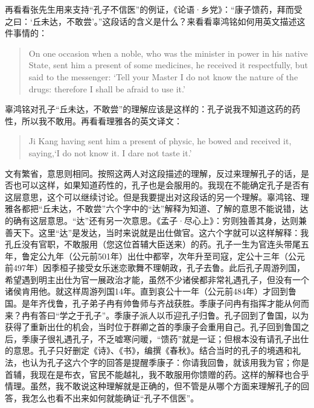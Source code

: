 再看看张先生用来支持“孔子不信医”的例证，《论语·乡党》：“康子馈药，拜而受之曰：‘丘未达，不敢尝’。”这段话的含义是什么？来看看辜鸿铭如何用英文描述这件事情的：
\begin{quote}
On one occasion when a noble, who was the minister in power in his native State, sent him a present of some medicines, he received it respectfully, but said to the messenger: `Tell your Master I do not know the nature of the drugs: therefore I shall be afraid to use it.' 
\end{quote}
辜鸿铭对孔子“丘未达，不敢尝”的理解应该是这样的：孔子说我不知道这药的药性，所以我不敢用。再看看理雅各的英文译文：
\begin{quote}
Ji Kang having sent him a present of physic, he bowed and received it, saying,`I do not know it. I dare not taste it.'
\end{quote}
文有繁省，意思则相同。按照这两人对这段描述的理解，反过来理解孔子的话，是否也可以这样，如果知道药性的，孔子也是会服用的。我现在不能确定孔子是否有这层意思，这个可以继续讨论。但是我要提出对这段话的另一个理解。辜鸿铭、理雅各都把“丘未达，不敢尝”六个字中的“达”解释为知道、了解的意思不能说错，达的确有这层意思。“达”还有另一次意思。《孟子·尽心上》：穷则独善其身，达则兼善天下。这里“达”是发达，当时来说就是出仕做官。这六个字就可以这样解释：我孔丘没有官职，不敢服用（您这位首辅大臣送来）的药。孔子一生为官连头带尾五年，鲁定公九年（公元前501年）出仕中都宰，次年升至司寇，定公十三年（公元前497年）因季桓子接受女乐迷恋歌舞不理朝政，孔子去鲁。此后孔子周游列国，希望遇到明主出仕为官一展政治才能，虽然不少诸侯都非常礼遇孔子，但没有一个诸侯肯用他。就这样周游列国14年。直到哀公十一年（公元前484年）才回到鲁国。是年齐伐鲁，孔子弟子冉有帅鲁师与齐战获胜。季康子问冉有指挥才能从何而来？冉有答曰“学之于孔子”。季康子派人以币迎孔子归鲁。孔子回到了鲁国，以为获得了重新出仕的机会，当时位于群卿之首的季康子会重用自己。孔子回到鲁国之后，季康子很礼遇孔子，不乏嘘寒问暖，“馈药”就是一证；但根本没有请孔子出仕的意思。孔子只好删定《诗》、《书》，编撰《春秋》。结合当时的孔子的境遇和礼法，也认为孔子这六个字的回答是提醒季康子：你请我回鲁，就该用我为官；你是首辅，我现在是布衣，官民不能越礼，我不敢服用你馈赠的药。这样的解释也合乎情理。虽然，我不敢说这种理解就是正确的，但不管是从哪个方面来理解孔子的回答，我怎么也看不出来如何就能确证“孔子不信医”。


